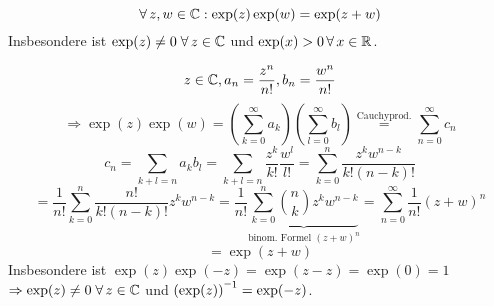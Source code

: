\documentclass[../ana1.tex]{subfiles}
\begin{document}
\begin{satz}[Additionstherem]
    \[ \forall \, z,w\in\mathbb{C} : \exp(z) \exp(w) = \exp(z+w) \]
    Insbesondere ist \( \exp(z) \neq 0 \;\forall \, z\in\mathbb{C} \) und \( \exp(x)>0 \,\forall \, x\in\mathbb{R} \).
\end{satz}
\begin{bew}
    \[ z\in\mathbb{C}, a_n = \frac{ z^n }{ n! }, b_n = \frac{ w^n }{ n! } \]
    \[ \Rightarrow \exp(z)\exp(w) = \left( \sum_{k=0}^\infty a_k \right) \left( \sum_{l=0}^\infty b_l \right) \overset{\text{Cauchyprod.}}{=} \sum_{n=0}^\infty c_n \]
    \[ c_n = \sum_{k+l=n} a_k b_l = \sum_{k+l=n} \frac{z^k}{k!} \frac{w^l}{l!} = \sum_{k=0}^n \frac{ z^k w^{n-k} }{ k!(n-k)! } \]
    \[ = \frac{1}{n!} \sum_{k=0}^n \frac{ n! }{ k!(n-k)! } z^k w^{n-k} = \frac{1}{n!} \underbrace{ \sum_{k=0}^n \binom{n}{k} z^k w^{n-k} }_{\text{binom. Formel } {(z+w)}^n} = \sum_{n=0}^\infty \frac{1}{n!} {(z+w)}^n \]
    \[ = \exp(z+w) \]
    Insbesondere ist \( \exp(z) \exp(-z) = \exp(z-z) = \exp(0) = 1 \) \\
    \( \Rightarrow \exp(z) \neq 0 \;\forall \, z\in\mathbb{C} \) und \( \inverse{(\exp(z))} = \exp(-z) \).
\end{bew}
\end{document}
